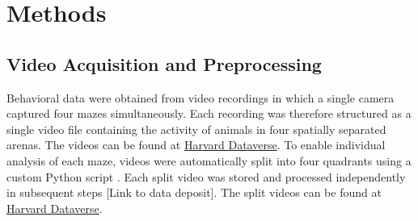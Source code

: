 \section{Methods}

\subsection{Video Acquisition and Preprocessing}
Behavioral data were obtained from video recordings in which a single camera captured four mazes simultaneously. Each recording was therefore structured as a single video file containing the activity of animals in four spatially separated arenas. The videos can be found at \href{https://doi.org/10.7910/DVN/WHH7W2}{Harvard Dataverse}. To enable individual analysis of each maze, videos were automatically split into four quadrants using a custom Python script \href{https://github.com/atanugiri/GhrelinBehaviorQuantification/blob/main/Python_scripts/Utility_functions/split_videos_by_quadrants.py}{}.
Each split video was stored and processed independently in subsequent steps [Link to data deposit]. The split videos can be found at \href{https://doi.org/10.7910/DVN/WHH7W2}{Harvard Dataverse}.
